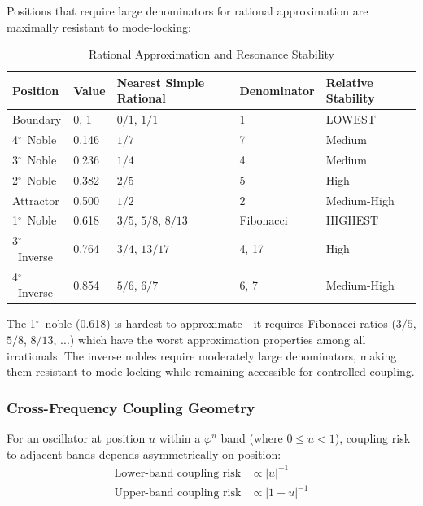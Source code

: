 \documentclass[11pt,a4paper]{article}
\newcommand{\degree}{$^\circ$}  %
\newcommand{\phisym}{\varphi}
\begin{document}
Positions that require large denominators for rational approximation are maximally resistant to mode-locking:

\begin{table}[H]
\centering
\caption{Rational Approximation and Resonance Stability}
\label{tab:resonance_stability}
\begin{tabular}{@{}lllll@{}}
\toprule
Position & Value & Nearest Simple Rational & Denominator & Relative Stability \\
\midrule
Boundary & 0, 1 & $0/1$, $1/1$ & 1 & LOWEST \\
4\degree\ Noble & 0.146 & $1/7$ & 7 & Medium \\
3\degree\ Noble & 0.236 & $1/4$ & 4 & Medium \\
2\degree\ Noble & 0.382 & $2/5$ & 5 & High \\
Attractor & 0.500 & $1/2$ & 2 & Medium-High \\
1\degree\ Noble & 0.618 & $3/5$, $5/8$, $8/13$ & Fibonacci & HIGHEST \\
3\degree\ Inverse & 0.764 & $3/4$, $13/17$ & 4, 17 & High \\
4\degree\ Inverse & 0.854 & $5/6$, $6/7$ & 6, 7 & Medium-High \\
\bottomrule
\end{tabular}
\end{table}

The 1\degree\ noble (0.618) is hardest to approximate---it requires Fibonacci ratios ($3/5$, $5/8$, $8/13$, ...) which have the worst approximation properties among all irrationals. The inverse nobles require moderately large denominators, making them resistant to mode-locking while remaining accessible for controlled coupling.

\subsubsection{Cross-Frequency Coupling Geometry}
\label{sec:coupling_geometry}

For an oscillator at position $u$ within a $\phisym^n$ band (where $0 \leq u < 1$), coupling risk to adjacent bands depends asymmetrically on position:
\begin{align}
\text{Lower-band coupling risk} &\propto |u|^{-1} \\
\text{Upper-band coupling risk} &\propto |1-u|^{-1}
\end{align}
\end{document}
